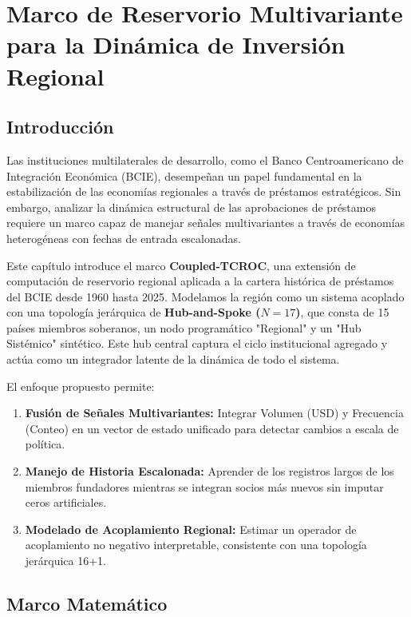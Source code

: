\documentclass[11pt, letterpaper]{report}
\begin{document}

\chapter{Marco de Reservorio Multivariante para la Dinámica de Inversión Regional}

\section{Introducción}

Las instituciones multilaterales de desarrollo, como el Banco Centroamericano de Integración Económica (BCIE), desempeñan un papel fundamental en la estabilización de las economías regionales a través de préstamos estratégicos. Sin embargo, analizar la dinámica estructural de las aprobaciones de préstamos requiere un marco capaz de manejar señales multivariantes a través de economías heterogéneas con fechas de entrada escalonadas.

Este capítulo introduce el marco \textbf{Coupled-TCROC}, una extensión de computación de reservorio regional aplicada a la cartera histórica de préstamos del BCIE desde 1960 hasta 2025. Modelamos la región como un sistema acoplado con una topología jerárquica de \textbf{Hub-and-Spoke ($N=17$)}, que consta de 15 países miembros soberanos, un nodo programático "Regional" y un "Hub Sistémico" sintético. Este hub central captura el ciclo institucional agregado y actúa como un integrador latente de la dinámica de todo el sistema.

El enfoque propuesto permite:
\begin{enumerate}
    \item \textbf{Fusión de Señales Multivariantes:} Integrar Volumen (USD) y Frecuencia (Conteo) en un vector de estado unificado para detectar cambios a escala de política.
    \item \textbf{Manejo de Historia Escalonada:} Aprender de los registros largos de los miembros fundadores mientras se integran socios más nuevos sin imputar ceros artificiales.
    \item \textbf{Modelado de Acoplamiento Regional:} Estimar un operador de acoplamiento no negativo interpretable, consistente con una topología jerárquica 16+1.
\end{enumerate}

\section{Marco Matemático}
\end{document}
